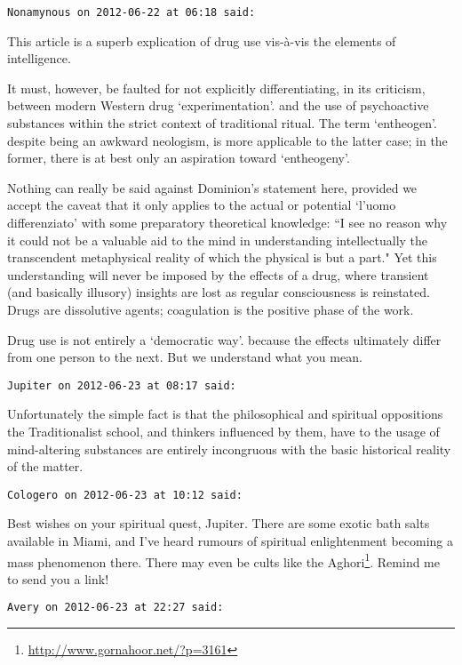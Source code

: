 \begin{footnotesize}
\begin{sffamily}
\hfill


\hfill

\texttt{Nonamynous on 2012-06-22 at 06:18 said: }

This article is a superb explication of drug use vis-à-vis the elements of intelligence.

It must, however, be faulted for not explicitly differentiating, in its criticism, between modern Western drug `experimentation'. and the use of psychoactive substances within the strict context of traditional ritual. The term `entheogen'. despite being an awkward neologism, is more applicable to the latter case; in the former, there is at best only an aspiration toward `entheogeny'.

Nothing can really be said against Dominion's statement here, provided we accept the caveat that it only applies to the actual or potential `l'uomo differenziato' with some preparatory theoretical knowledge: ``I see no reason why it could not be a valuable aid to the mind in understanding intellectually the transcendent metaphysical reality of which the physical is but a part." Yet this understanding will never be imposed by the effects of a drug, where transient (and basically illusory) insights are lost as regular consciousness is reinstated. Drugs are dissolutive agents; coagulation is the positive phase of the work.

Drug use is not entirely a `democratic way'. because the effects ultimately differ from one person to the next. But we understand what you mean.


\hfill

\texttt{Jupiter on 2012-06-23 at 08:17 said: }

Unfortunately the simple fact is that the philosophical and spiritual oppositions the Traditionalist school, and thinkers influenced by them, have to the usage of mind-altering substances are entirely incongruous with the basic historical reality of the matter.


\hfill

\texttt{Cologero on 2012-06-23 at 10:12 said: }

Best wishes on your spiritual quest, Jupiter. There are some exotic bath salts available in Miami, and I've heard rumours of spiritual enlightenment becoming a mass phenomenon there. There may even be cults like the Aghori\footnote{\url{http://www.gornahoor.net/?p=3161}}. Remind me to send you a link!


\hfill

\texttt{Avery on 2012-06-23 at 22:27 said: }


\end{sffamily}
\end{footnotesize}

